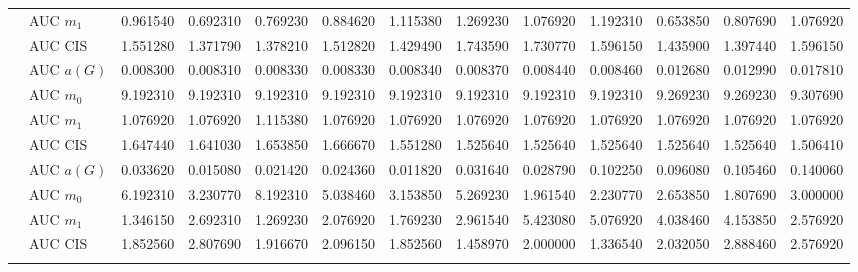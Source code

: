 \begin{table}[htbp]
\begin{tabular}{llrrrrrrrrrrr}
    & AUC $m_1$ & 0.961540 & 0.692310 & 0.769230 & 0.884620 & 1.115380 & 1.269230 & 1.076920 & 1.192310 & 0.653850 & 0.807690 & 1.076920 \\
    & AUC CIS & 1.551280 & 1.371790 & 1.378210 & 1.512820 & 1.429490 & 1.743590 & 1.730770 & 1.596150 & 1.435900 & 1.397440 & 1.596150 \\
    \addlinespace
    \multirow{4}{*}{degree} & AUC $a(G)$ & 0.008300 & 0.008310 & 0.008330 & 0.008330 & 0.008340 & 0.008370 & 0.008440 & 0.008460 & 0.012680 & 0.012990 & 0.017810 \\
    & AUC $m_0$ & 9.192310 & 9.192310 & 9.192310 & 9.192310 & 9.192310 & 9.192310 & 9.192310 & 9.192310 & 9.269230 & 9.269230 & 9.307690 \\
    & AUC $m_1$ & 1.076920 & 1.076920 & 1.115380 & 1.076920 & 1.076920 & 1.076920 & 1.076920 & 1.076920 & 1.076920 & 1.076920 & 1.076920 \\
    & AUC CIS & 1.647440 & 1.641030 & 1.653850 & 1.666670 & 1.551280 & 1.525640 & 1.525640 & 1.525640 & 1.525640 & 1.525640 & 1.506410 \\
    \addlinespace
    \multirow{4}{*}{random} & AUC $a(G)$ & 0.033620 & 0.015080 & 0.021420 & 0.024360 & 0.011820 & 0.031640 & 0.028790 & 0.102250 & 0.096080 & 0.105460 & 0.140060 \\
    & AUC $m_0$ & 6.192310 & 3.230770 & 8.192310 & 5.038460 & 3.153850 & 5.269230 & 1.961540 & 2.230770 & 2.653850 & 1.807690 & 3.000000 \\
    & AUC $m_1$ & 1.346150 & 2.692310 & 1.269230 & 2.076920 & 1.769230 & 2.961540 & 5.423080 & 5.076920 & 4.038460 & 4.153850 & 2.576920 \\
    & AUC CIS & 1.852560 & 2.807690 & 1.916670 & 2.096150 & 1.852560 & 1.458970 & 2.000000 & 1.336540 & 2.032050 & 2.888460 & 2.576920 \\
    \addlinespace
    \bottomrule
  \end{tabular}
\end{table}

